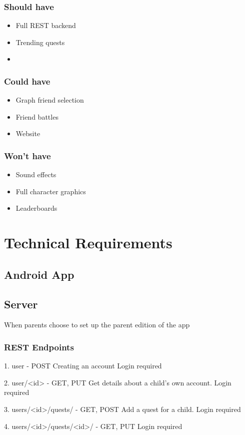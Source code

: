 \subsubsection{Should have}
\begin{itemize}
	\item Full REST backend
	\item Trending quests
	\item 
\end{itemize}

\subsubsection{Could have}
\begin{itemize}
	\item Graph friend selection 
	\item Friend battles
	\item Website
\end{itemize}

\subsubsection{Won't have}
\begin{itemize}
	\item Sound effects
	\item Full character graphics
	\item Leaderboards
\end{itemize}

\section{Technical Requirements}
\subsection{Android App}

\subsection{Server}
When parents choose to set up the parent edition of the app

\subsubsection{REST Endpoints}
1. user - POST
Creating an account
Login required

2. user/<id> - GET, PUT
Get details about a child's own account.
Login required

3. users/<id>/quests/ - GET, POST
Add a quest for a child.
Login required

4. users/<id>/quests/<id>/ - GET, PUT
Login required